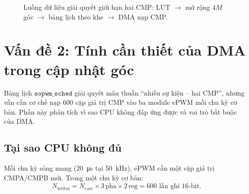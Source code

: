 \documentclass[12pt,a4paper]{article}
\begin{document}
\begin{figure}[htbp]
  \centering
  \caption{Luồng dữ liệu giải quyết giới hạn hai CMP: LUT $\rightarrow$ mở rộng $4M$ góc $\rightarrow$ bảng lịch theo khe $\rightarrow$ DMA nạp CMP.}
  \label{fig:flow}
\end{figure}

\section{Vấn đề 2: Tính cần thiết của DMA trong cập nhật góc}

Bảng lịch $\texttt{sopwm\_sched}$ giải quyết mâu thuẫn ``nhiều sự kiện -- hai CMP'', nhưng vẫn cần cơ chế nạp $600$ cặp giá trị CMP vào ba module ePWM mỗi chu kỳ cơ bản. Phần này phân tích vì sao CPU không đáp ứng được và vai trò bắt buộc của DMA.

\subsection{Tại sao CPU không đủ}

Mỗi chu kỳ sóng mang (\SI{20}{\micro\second} tại \SI{50}{\kilo\hertz}), ePWM cần một cặp giá trị CMPA/CMPB mới. Trong một chu kỳ cơ bản:
\begin{equation}
  N_{\mathrm{writes}} = N_{\mathrm{carr}} \times 3\,\text{pha} \times 2\,\text{reg} = 600 \text{ lần ghi 16-bit}.
\end{equation}
\end{document}

